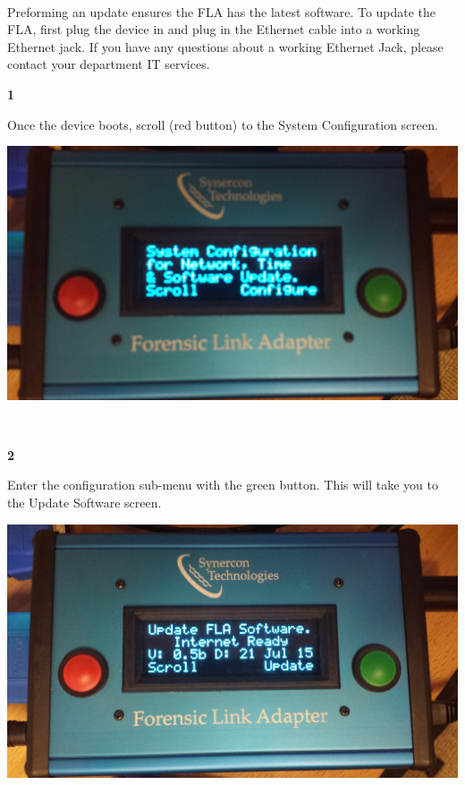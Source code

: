\documentclass[11pt]{article}
\begin{document}
\paragraph{  }
Preforming an update ensures the FLA has the latest software. To update the FLA, first plug the device in and plug in the Ethernet cable into a working Ethernet jack. If you have any questions about a working Ethernet Jack, please contact your department IT services.
\\[\baselineskip]
\noindent\begin{minipage}{0.3\textwidth}%
\begin{center}
\textbf{1}\\[\baselineskip]
\end{center}
Once the device boots, scroll (red button) to the System Configuration screen.
\end{minipage}%
\hfill%
\begin{minipage}{0.6\textwidth}
\includegraphics[width=\linewidth]{./fla_screens/sys_conf}
\end{minipage}
\\[\baselineskip]
\noindent\begin{minipage}{0.3\textwidth}%
\begin{center}
\textbf{2}\\[\baselineskip]
\end{center}
Enter the configuration sub-menu with the green button. This will take you to the Update Software screen.
\end{minipage}%
\hfill%
\begin{minipage}{0.6\textwidth}
\includegraphics[width=\linewidth]{./fla_screens/update_ready}
\end{minipage}
\end{document}
